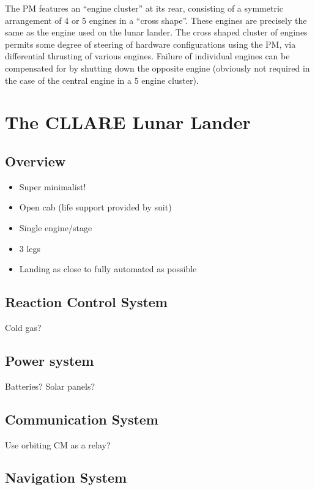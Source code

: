 \documentclass{report}
\begin{document}
The PM features an ``engine cluster'' at its rear, consisting of a symmetric arrangement of 4 or 5 engines in a ``cross shape''.  These engines are precisely the same as the engine used on the lunar lander.  The cross shaped cluster of engines permits some degree of steering of hardware configurations using the PM, via differential thrusting of various engines.  Failure of individual engines can be compensated for by shutting down the opposite engine (obviously not required in the case of the central engine in a 5 engine cluster).


\section{The CLLARE Lunar Lander}

\subsection{Overview}

\begin{itemize}
\item Super minimalist!
\item Open cab (life support provided by suit)
\item Single engine/stage
\item 3 legs
\item Landing as close to fully automated as possible
\end{itemize}

\subsection{Reaction Control System}

Cold gas?

\subsection{Power system}

Batteries?  Solar panels?

\subsection{Communication System}

Use orbiting CM as a relay?

\subsection{Navigation System}
\end{document}
